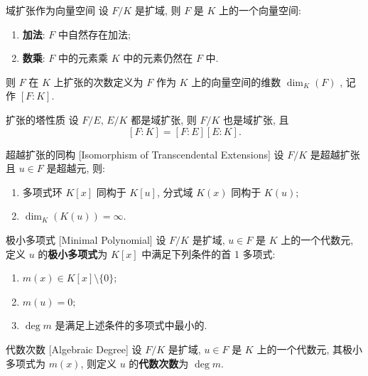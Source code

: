         \begin{thm}
            {域扩张作为向量空间}
            设 \(F/K\) 是扩域, 则 \(F\) 是 \(K\) 上的一个向量空间:
            \begin{enumerate}
                \item \textbf{加法}: \(F\) 中自然存在加法;
                \item \textbf{数乘}: \(F\) 中的元素乘 \(K\) 中的元素仍然在 \(F\) 中.
            \end{enumerate}
            则 \(F\) 在 \(K\) 上扩张的次数定义为 \(F\) 作为 \(K\) 上的向量空间的维数 \(\dim_K(F)\) , 记作 \([F:K]\).
        \end{thm}

        \begin{ppt}
            {扩张的塔性质}
            设 \(F/E\), \(E/K\) 都是域扩张, 则 \(F/K\) 也是域扩张, 且 
            \[[F:K]=[F:E][E:K].\]
        \end{ppt}

        \begin{thm}
            {超越扩张的同构}
            [Isomorphism of Transcendental Extensions]
            设 \(F/K\) 是超越扩张且 \(u\in F\) 是超越元, 则:
            \begin{enumerate}
                \item 多项式环 \(K[x]\) 同构于 \(K[u]\), 分式域 \(K(x)\) 同构于 \(K(u)\);
                \item \(\dim_K(K(u)) = \infty\).
            \end{enumerate}
        \end{thm}

        \begin{dfn}
            {极小多项式}
            [Minimal Polynomial]
            设 \(F/K\) 是扩域, \(u\in F\) 是 \(K\) 上的一个代数元, 定义 \(u\) 的\textbf{极小多项式}为 \(K[x]\) 中满足下列条件的首 1 多项式:
            \begin{enumerate}
                \item \(m(x)\in K[x]\setminus\{0\}\);
                \item \(m(u)=0\);
                \item \(\deg m\) 是满足上述条件的多项式中最小的.
            \end{enumerate}
        \end{dfn}

        \begin{dfn}
            {代数次数}
            [Algebraic Degree]
            设 \(F/K\) 是扩域, \(u\in F\) 是 \(K\) 上的一个代数元, 其极小多项式为 \(m(x)\), 则定义 \(u\) 的\textbf{代数次数}为 \(\deg m\).
        \end{dfn}

